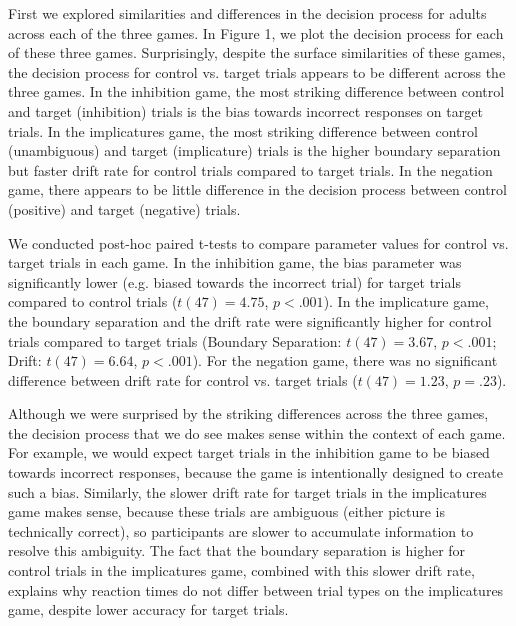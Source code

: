 \documentclass[10pt,letterpaper]{article}
\begin{document}
First we explored similarities and differences in the decision process for adults across each of the three games.  In Figure 1, we plot the decision process for each of these three games.  Surprisingly, despite the surface similarities of these games, the decision process for control vs. target trials appears to be different across the three games.  In the inhibition game, the most striking difference between control and target (inhibition) trials is the bias towards incorrect responses on target trials.  In the implicatures game, the most striking difference between control (unambiguous) and target (implicature) trials is the higher boundary separation but faster drift rate for control trials compared to target trials.  In the negation game, there appears to be little difference in the decision process between control (positive) and target (negative) trials.

We conducted post-hoc paired t-tests to compare parameter values for control vs. target trials in each game.  In the inhibition game, the bias parameter was significantly lower (e.g. biased towards the incorrect trial) for target trials compared to control trials ($t(47) = 4.75$, $p< .001$).  In the implicature game, the boundary separation and the drift rate were significantly higher for control trials compared to target trials (Boundary Separation: $t(47) = 3.67$, $p< .001$; Drift: $t(47) = 6.64$, $p< .001$).  For the negation game, there was no significant difference between drift rate for control vs. target trials ($t(47) = 1.23$, $p = .23$).  

Although we were surprised by the striking differences across the three games, the decision process that we do see makes sense within the context of each game.  For example, we would expect target trials in the inhibition game to be biased towards incorrect responses, because the game is intentionally designed to create such a bias.  Similarly, the slower drift rate for target trials in the implicatures game makes sense, because these trials are ambiguous (either picture is technically correct), so participants are slower to accumulate information to resolve this ambiguity. The fact that the boundary separation is higher for control trials in the implicatures game, combined with this slower drift rate, explains why reaction times do not differ between trial types on the implicatures game, despite lower accuracy for target trials.  
\end{document}
